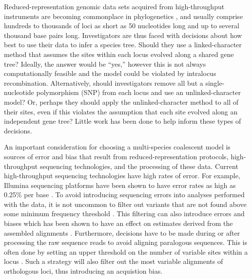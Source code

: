 Reduced-representation genomic data sets acquired from high-throughput
instruments are becoming commonplace in phylogenetics \citep{Leache2017}, and
usually comprise hundreds to thousands of loci as short as 50 nucleotides long
and up to several thousand base pairs long.
Investigators are thus faced with decisions about how best to 
use their data to infer a species tree.
Should they use a linked-character method that assumes the sites within each
locus evolved along a shared gene tree?
Ideally, the answer would be ``yes,'' however this is not always
computationally feasible and the model could be violated by intralocus
recombination.
Alternatively, should investigators remove all but a single-nucleotide
polymorphism (SNP) from each locus and use an unlinked-character model?
Or, perhaps they should apply the unlinked-character method to all of their
sites, even if this violates the assumption that each site evolved along an
independent gene tree?
Little work has been done to help inform these types of decisions. 

An important consideration for choosing a multi-species coalescent model is
sources of error and bias that result from reduced-representation protocols,
high-throughput sequencing technologies, and the processing of these data.
Current high-throughput sequencing technologies have high rates of error.
For example, Illumina sequencing platforms have been shown to have error rates
as high as 0.25\% per base 
\citep{@pfeifferSystematicEvaluationError2018}. 
To avoid introducing sequencing errors into analyses performed with the data, it is not 
uncommon to filter out variants that are not found above some minimum frequency 
threshold \citep{rochetteStacksAnalyticalMethods2019, linckMinorAlleleFrequency2019}. 
This filtering can also introduce errors and biases which has been 
shown to have an effect on estimates derived from the assembled alignments
\citep{Harvey2015,linckMinorAlleleFrequency2019}.
Furthermore, decisions have to be made during or after processing
the raw sequence reads to avoid aligning paralogous sequences.
This is often done by setting an upper threshold on the number of variable
sites within a locus \citationNeeded.
Such a strategy will also filter out the most variable alignments
of orthologous loci, thus introducing an acquistion bias.


